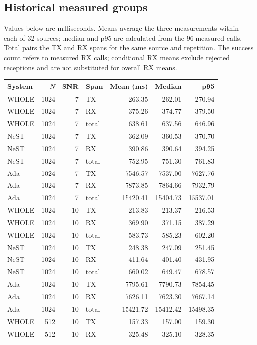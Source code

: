\documentclass[10pt,letterpaper]{article}
\begin{document}
\subsection{Historical measured groups}\label{sup:timing-historical-groups}
Values below are milliseconds. Means average the three measurements within each of 32 sources; median and p95 are calculated from the 96 measured calls. Total pairs the TX and RX spans for the same source and repetition. The success count refers to measured RX calls; conditional RX means exclude rejected receptions and are not substituted for overall RX means.
\begin{longtable}{@{}lrrlrrr@{}}\toprule
System & $N$ & SNR & Span & Mean (ms) & Median & p95\\\midrule\endhead
WHOLE & 1024 & 7 & TX & 263.35 & 262.01 & 270.94\\
WHOLE & 1024 & 7 & RX & 375.26 & 374.77 & 379.50\\
WHOLE & 1024 & 7 & total & 638.61 & 637.56 & 646.96\\
NeST & 1024 & 7 & TX & 362.09 & 360.53 & 370.70\\
NeST & 1024 & 7 & RX & 390.86 & 390.64 & 394.25\\
NeST & 1024 & 7 & total & 752.95 & 751.30 & 761.83\\
Ada & 1024 & 7 & TX & 7546.57 & 7537.00 & 7627.76\\
Ada & 1024 & 7 & RX & 7873.85 & 7864.66 & 7932.79\\
Ada & 1024 & 7 & total & 15420.41 & 15404.73 & 15537.01\\
WHOLE & 1024 & 10 & TX & 213.83 & 213.37 & 216.53\\
WHOLE & 1024 & 10 & RX & 369.90 & 371.15 & 387.29\\
WHOLE & 1024 & 10 & total & 583.73 & 585.23 & 602.20\\
NeST & 1024 & 10 & TX & 248.38 & 247.09 & 251.45\\
NeST & 1024 & 10 & RX & 411.64 & 401.40 & 431.95\\
NeST & 1024 & 10 & total & 660.02 & 649.47 & 678.57\\
Ada & 1024 & 10 & TX & 7795.61 & 7790.73 & 7854.45\\
Ada & 1024 & 10 & RX & 7626.11 & 7623.30 & 7667.14\\
Ada & 1024 & 10 & total & 15421.72 & 15412.42 & 15498.35\\
WHOLE & 512 & 10 & TX & 157.33 & 157.00 & 159.30\\
WHOLE & 512 & 10 & RX & 325.48 & 325.10 & 328.35\\

\end{longtable}
\end{document}
